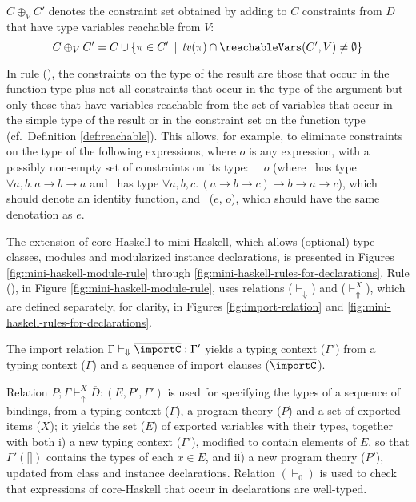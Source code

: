 $C \oplus_V C'$ denotes the constraint set obtained by adding to $C$
constraints from $D$ that have type variables reachable from $V$:
  \[ C \oplus_V C' = C \cup \{ \pi \in C'\,\mid\, \tv(\pi) \cap \reachableVars(C',V) \not= \emptyset \} \]

In rule (\APP), the constraints on the type of the result are those
that occur in the function type plus not all constraints that occur in
the type of the argument but only those that have variables reachable
from the set of variables that occur in the simple type of the result
or in the constraint set on the function type (cf.~Definition
\ref{def:reachable}).  This allows, for example, to eliminate
constraints on the type of the following expressions, where $o$ is any
expression, with a possibly non-empty set of constraints on its type:
{\tt \flip\ \const\ $o$} (where \const\ has type $\forall a, b.\,a
\rightarrow b \rightarrow a$ and \flip\ has type $\forall a, b, c.\,(a
\rightarrow b \rightarrow c) \rightarrow b \rightarrow a\rightarrow
c$), which should denote an identity function, and \fst\ ($e$, $o$),
which should have the same denotation as $e$.

The extension of core-Haskell to mini-Haskell, which allows (optional)
type classes, modules and modularized instance declarations, is
presented in Figures \ref{fig:mini-haskell-module-rule} through
\ref{fig:mini-haskell-rules-for-declarations}. Rule (\MODULE), in
Figure \ref{fig:mini-haskell-module-rule}, uses relations
($\vdash_{\Downarrow}$) and ($\vdash_{\Uparrow}^X$), which are defined
separately, for clarity, in Figures \ref{fig:import-relation} and
\ref{fig:mini-haskell-rules-for-declarations}.

The import relation $\Gamma \vdash_{\Downarrow} \overline{\importC} :
\Gamma'$ yields a typing context ($\Gamma'$) from a typing context
($\Gamma$) and a sequence of import clauses ($\overline{\importC}$).

Relation $P;\Gamma \vdash_{\Uparrow}^X \overline{\!D}:(E,P',\Gamma')$
is used for specifying the types of a sequence of bindings, from a
typing context ($\Gamma$), a program theory ($P$) and a set of
exported items ($X$); it yields the set ($E$) of exported variables
with their types, together with both i) a new typing context
($\Gamma'$), modified to contain elements of $E$, so that
$\Gamma'(\texttt{[]})$ contains the types of each $x\in E$, and ii) a
new program theory ($P'$), updated from class and instance
declarations. Relation $(\vdash_0)$ is used to check that expressions
of core-Haskell that occur in declarations are well-typed.

